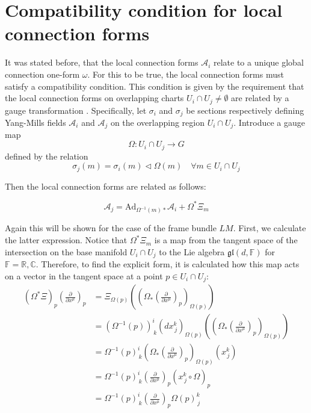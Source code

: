 \section{Compatibility condition for local connection forms}


It was stated before, that the local connection forms $\mathcal{A}_i$ relate to a unique global connection one-form $\omega$. For this to be true, the local connection forms must satisfy a compatibility condition. This condition is given by the requirement that the local connection forms on overlapping charts \( U_i \cap U_j \neq \emptyset\) are related by a gauge transformation \cite{NakaharaGeometrytopologyphysics2005}. Specifically, let $\sigma_i$ and $\sigma_j$ be sections respectively defining Yang-Mills fields \( \mathcal{A}_i \) and \( \mathcal{A}_j \) on the overlapping region \( U_i \cap U_j \). Introduce a gauge map
\[ \Omega : U_i \cap U_j \longrightarrow G \]
defined by the relation
\[ \sigma_j(m) = \sigma_i(m) \triangleleft \Omega(m) \quad \forall m \in U_i \cap U_j \]


Then the local connection forms are related as follows:

\[ \mathcal{A}_j = \text{Ad}_{\Omega^{-1}(m)*} \mathcal{A}_i + \Omega^*\Xi_m \]

Again this will be shown for the case of the frame bundle \( LM \). First, we calculate the latter expression. Notice that \( \Omega^* \Xi_m \) is a map from the tangent space of the intersection on the base manifold \( U_i \cap U_j \) to the Lie algebra \( \mathfrak{gl}(d, \mathbb{F}) \) for $\mathbb{F} = \mathbb{R,C}$. Therefore, to find the explicit form, it is calculated how this map acts on a vector in the tangent space at a point $p\in U_i \cap U_j$:
\begin{align*}
  (\Omega^* \Xi)_p \left( \frac{\partial}{\partial x^\mu} \right)_p 
  &= \Xi_{\Omega(p)}\left( \left( \Omega_* \left( \frac{\partial}{\partial x^\mu} \right)_p \right)_{\Omega(p)} \right) \\
  &= (\Omega^{-1}(p))^i_{\,k}(dx^k_{\,j})_{\Omega(p)}\left( \left( \Omega_* \left( \frac{\partial}{\partial x^\mu} \right)_p \right)_{\Omega(p)} \right) \\
  &= \Omega^{-1}(p)^i_{\,k} \left( \Omega_* \left( \frac{\partial}{\partial x^\mu} \right)_p \right)_{\Omega(p)} \left( x^k_{\,j} \right) \\
  &= \Omega^{-1}(p)^i_{\,k} \left( \frac{\partial}{\partial x^\mu}  \right)_p \left( x^k_{\,j} \circ \Omega \right)_p \\
  &= \Omega^{-1}(p)^i_{\,k} \left( \frac{\partial}{\partial x^\mu}  \right)_p \Omega(p)^k_{\,j}
\end{align*}

